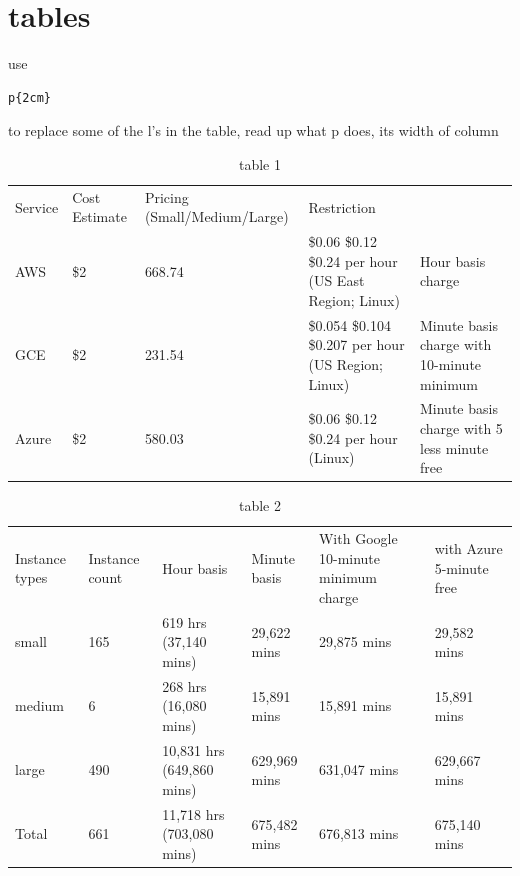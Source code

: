 \documentclass{sig-alternate}
\begin{document}

\section{tables}

use
\begin{verbatim}
p{2cm} 
\end{verbatim}
to replace some of the l's in the table, read up what p does, its
width of column


\begin{table}[htb]
\caption{table 1}\label{T:tab1}
\begin{tabular}{lllll}
Service & Cost Estimate & Pricing (Small/Medium/Large) & Restriction \\
AWS & \$2 & 668.74  & \$0.06 \$0.12 \$0.24 per hour (US East Region; Linux) & Hour basis charge\\
GCE & \$2 & 231.54  & \$0.054 \$0.104 \$0.207 per hour (US Region; Linux) & Minute basis charge with 10-minute minimum\\
Azure & \$2 & 580.03  & \$0.06 \$0.12 \$0.24 per hour (Linux) & Minute basis charge with 5 less minute free\\
\end{tabular}
\end{table}

\begin{table}[htb]
\caption{table 2}\label{T:tab2}
\begin{tabular}{llllll}
Instance types & Instance count & Hour basis & Minute basis & With Google 10-minute minimum charge & with Azure 5-minute free \\
small & 165 & 619 hrs (37,140 mins) & 29,622 mins & 29,875 mins &29,582 mins \\
medium & 6 & 268 hrs (16,080 mins) & 15,891 mins & 15,891 mins & 15,891 mins\\
large & 490 & 10,831 hrs (649,860 mins) & 629,969 mins & 631,047 mins & 629,667 mins\\
Total & 661 & 11,718 hrs (703,080 mins) & 675,482 mins & 676,813 mins & 675,140 mins\\
\end{tabular}
\end{table}
\end{document}

